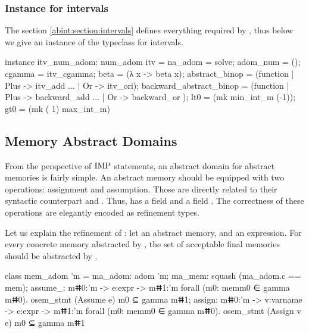 \documentclass{llncs}
\begin{document}
\subsubsection{Instance for intervals}
%
The section \ref{abint:section:intervals} defines everything required by
, thus below we give an instance of the typeclass
 for intervals.
%
\begin{fstarcode}
instance itv_num_adom: num_adom itv = {
  na_adom = solve; adom_num = (); cgamma = itv_cgamma; beta = (λ x -> beta x);
  abstract_binop = (function | Plus -> itv_add ... | Or -> itv_ori);
  backward_abstract_binop = (function | Plus -> backward_add ... | Or -> backward_or );
  lt0 = (mk min_int_m (-1)); gt0 = (mk ( 1) max_int_m) }
\end{fstarcode}
%
\subsection{Memory Abstract Domains}
%
From the perspective of $\textrm{IMP}{}$ statements, an abstract domain
for abstract memories is fairly simple.
%
An abstract memory should be equipped with two operations:
assignment and assumption.
%
Those are directly related to their syntactic counterpart
 and .
%
Thus,  has a field  and a field
.
%
The correctness of these operations are elegantly encoded as
refinement types.
%

Let us explain the refinement of : let 
an abstract memory, and  an expression.
%
For every concrete memory  abstracted by ,
the set of acceptable final memories  should be abstracted by .
%
\begin{fstarcode}
class mem_adom 'm = { ma_adom: adom 'm; ma_mem: squash (ma_adom.c == mem);
  assume_: mⵌ0:'m -> e:expr -> mⵌ1:'m
    {forall (m0: mem{m0 ∈ gamma mⵌ0}). osem_stmt (Assume   e) m0 ⊆ gamma mⵌ1};
  assign: mⵌ0:'m -> v:varname -> e:expr -> mⵌ1:'m
    {forall (m0: mem{m0 ∈ gamma mⵌ0}). osem_stmt (Assign v e) m0 ⊆ gamma mⵌ1}}
\end{fstarcode}
%
\end{document}
